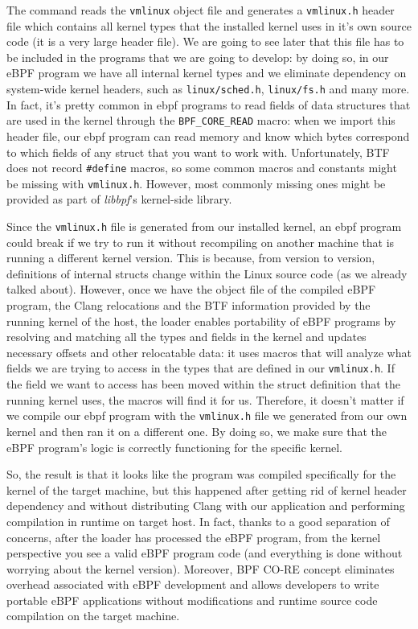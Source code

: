 The command reads the \verb|vmlinux| object file and generates a \verb|vmlinux.h| header file which contains all kernel types that the installed kernel uses in it’s own source code (it is a very large header file). 
We are going to see later that this file has to be included in the programs that we are going to develop: by doing so, in our eBPF program we have all internal kernel types and we eliminate dependency on system-wide kernel headers, such as \verb|linux/sched.h|, \verb|linux/fs.h| and many more.
In fact, it’s pretty common in ebpf programs to read fields of data structures that are used in the kernel through the \verb|BPF_CORE_READ| macro: when we import this header file, our ebpf program can read memory and know which bytes correspond to which fields of any struct that you want to work with.
Unfortunately, BTF does not record \verb|#define| macros, so some common macros and constants might be missing with \verb|vmlinux.h|. 
However, most commonly missing ones might be provided as part of \textit{libbpf}’s kernel-side library.

Since the \verb|vmlinux.h| file is generated from our installed kernel, an ebpf program could break if we try to run it without recompiling on another machine that is running a different kernel version. 
This is because, from version to version, definitions of internal structs change within the Linux source code (as we already talked about).
However, once we have the object file of the compiled eBPF program, the Clang relocations and the BTF information provided by the running kernel of the host, the loader enables portability of eBPF programs by resolving and matching all the types and fields in the kernel and updates necessary offsets and other relocatable data: it uses macros that will analyze what fields we are trying to access in the types that are defined in our \verb|vmlinux.h|. 
If the field we want to access has been moved within the struct definition that the running kernel uses, the macros will find it for us. 
Therefore, it doesn't matter if we compile our ebpf program with the \verb|vmlinux.h| file we generated from our own kernel and then ran it on a different one.
By doing so, we make sure that the eBPF program’s logic is correctly functioning for the specific kernel.

So, the result is that it looks like the program was compiled specifically for the kernel of the target machine, but this happened after getting rid of kernel header dependency and without distributing Clang with our application and performing compilation in runtime on target host.
In fact, thanks to a good separation of concerns, after the loader has processed the eBPF program, from the kernel perspective you see a valid eBPF program code (and everything is done without worrying about the kernel version).
Moreover, BPF CO-RE concept eliminates overhead associated with eBPF development and allows developers to write portable eBPF applications without modifications and runtime source code compilation on the target machine.

